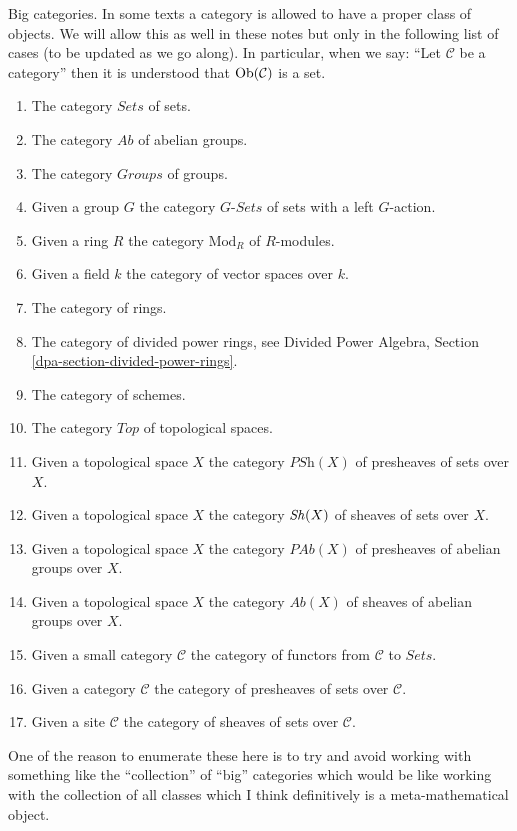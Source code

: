 \begin{remark}
\label{remark-big-categories}
Big categories. In some texts a category is allowed to have a proper
class of objects. We will allow this as well in these notes but only
in the following list of cases (to be updated as we go along).
In particular, when we say: ``Let $\mathcal{C}$ be a category''
then it is understood that $\mathop{\mathrm{Ob}}\nolimits(\mathcal{C})$ is a set.
\begin{enumerate}
\item The category $\textit{Sets}$ of sets.
\item The category $\textit{Ab}$ of abelian groups.
\item The category $\textit{Groups}$ of groups.
\item Given a group $G$ the category $G\textit{-Sets}$ of
sets with a left $G$-action.
\item Given a ring $R$ the category $\text{Mod}_R$ of $R$-modules.
\item Given a field $k$ the category of vector spaces over $k$.
\item The category of rings.
\item The category of divided power rings, see
Divided Power Algebra, Section \ref{dpa-section-divided-power-rings}.
\item The category of schemes.
\item The category $\textit{Top}$ of topological spaces.
\item Given a topological space $X$ the category
$\textit{PSh}(X)$ of presheaves of sets over $X$.
\item Given a topological space $X$ the category
$\mathop{\mathit{Sh}}\nolimits(X)$ of sheaves of sets over $X$.
\item Given a topological space $X$ the category
$\textit{PAb}(X)$ of presheaves of abelian groups over $X$.
\item Given a topological space $X$ the category
$\textit{Ab}(X)$ of sheaves of abelian groups over $X$.
\item Given a small category $\mathcal{C}$ the category of functors
from $\mathcal{C}$ to $\textit{Sets}$.
\item Given a category $\mathcal{C}$ the category of presheaves of sets
over $\mathcal{C}$.
\item Given a site $\mathcal{C}$ the category of sheaves
of sets over $\mathcal{C}$.
\end{enumerate}
One of the reason to enumerate these here is to try and avoid
working with something like the ``collection'' of ``big'' categories
which would be like working with the collection of all classes
which I think definitively is a meta-mathematical object.
\end{remark}

